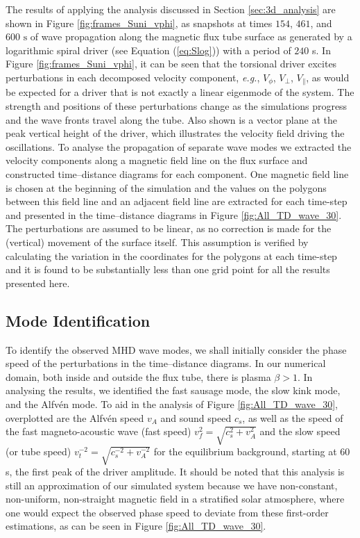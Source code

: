 The results of applying the analysis discussed in Section \ref{sec:3d_analysis} are shown in Figure \ref{fig:frames_Suni_vphi}, as snapshots at times $154$, $461$, and $600 \text{ s}$ of wave propagation along the magnetic flux tube surface as generated by a logarithmic spiral driver (see Equation (\ref{eq:Slog})) with a period of $240$ s.
 In Figure \ref{fig:frames_Suni_vphi}, it can be seen that the torsional driver excites perturbations in each decomposed velocity component, \textit{e.g.}, $V_\phi$,  $V_\perp$, $V_\parallel$, as would be expected for a driver that is not exactly a linear eigenmode of the system. 
 The strength and positions of these perturbations change as the simulations progress and the wave fronts travel along the tube. 
 Also shown is a vector plane at the peak vertical height of the driver, which illustrates the velocity field driving the oscillations.
To analyse the propagation of separate wave modes we extracted the velocity components along a magnetic field line on the flux surface and constructed time--distance diagrams for each component. 
 One magnetic field line is chosen at the beginning of the simulation and the values on the polygons between this field line and an adjacent field line are extracted for each time-step and presented in the time--distance diagrams in Figure \ref{fig:All_TD_wave_30}. 
 The perturbations are assumed to be linear, as no correction is made for the (vertical) movement of the surface itself. 
 This assumption is verified by calculating the variation in the coordinates for the polygons at each time-step and it is found to be substantially less than one grid point for all the results presented here.

\subsection{Mode Identification}
To identify the observed MHD wave modes, we shall initially consider the phase speed of the perturbations in the time--distance diagrams. 
 In our numerical domain, both inside and outside the flux tube, there is plasma $\beta > 1$.
 In analysing the results, we identified the fast sausage mode, the slow kink mode, and the Alfv\'en mode.
 To aid in the analysis of Figure \ref{fig:All_TD_wave_30}, overplotted are the Alfv\'en speed $v_A$ and sound speed $c_s$, as well as the speed of the fast magneto-acoustic wave (fast speed) $v_f^2 = \sqrt{c_s^2 + v_A^2}$ and the slow speed (or tube speed) $v_t^{-2} = \sqrt{c_s^{-2} + v_A^{-2}}$ for the equilibrium background, starting at $60$ s, the first peak of the driver amplitude. 
 It should be noted that this analysis is still an approximation of our simulated system because we have non-constant, non-uniform, non-straight magnetic field in a stratified solar atmosphere, where one would expect the observed phase speed to deviate from these first-order estimations, as can be seen in Figure \ref{fig:All_TD_wave_30}.


